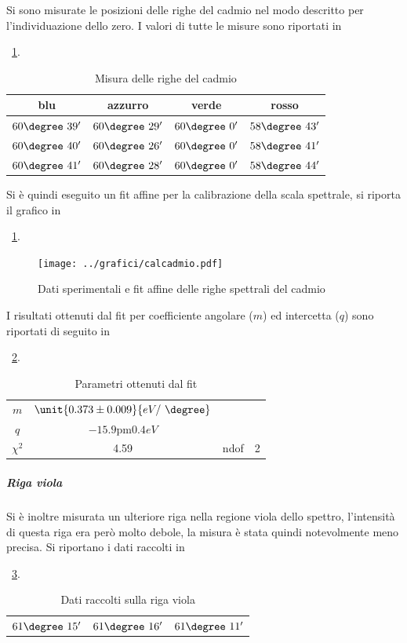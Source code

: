 \documentclass[a4paper,10pt]{article}
\begin{document}
Si sono misurate le posizioni delle righe del cadmio nel modo descritto per l'individuazione dello zero. I valori di tutte le misure sono riportati in \tablename{~\ref{tab:cadmio}.

\begin{table}[H]
	\centering
	\begin{tabular}{c|c|c|c}
	blu & azzurro & verde & rosso \\
	\hline
	$60\degree~39'$ & $60\degree~29'$ & $60\degree~0'$ & $58\degree~43'$\\
	$60\degree~40'$ & $60\degree~26'$ & $60\degree~0'$ & $58\degree~41'$\\
	$60\degree~41'$ & $60\degree~28'$ & $60\degree~0'$ & $58\degree~44'$\\
	\end{tabular}
	\caption{Misura delle righe del cadmio}
	\label{tab:cadmio}
\end{table}

Si è quindi eseguito un fit affine per la calibrazione della scala spettrale, si riporta il grafico in \figurename{~\ref{fig:cadmio}.

\begin{figure}[H]
	\centering
	\texttt{[image: ../grafici/calcadmio.pdf]}
	\caption{Dati sperimentali e fit affine delle righe spettrali del cadmio}
	\label{fig:cadmio}
\end{figure}

I risultati ottenuti dal fit per coefficiente angolare ($m$) ed intercetta ($q$) sono riportati di seguito in \tablename{~\ref{tab:calcadmio}.
	

\begin{table}[H]
	\centering
	\begin{tabular}{|c|c|c|c|}
		\cline{0-1}		
		$m$ & $\unit{0.373 \pm 0.009}{eV/~\degree}$ \\
		\cline{0-1}
		$q$ & $\unit{-15.9 \pm 0.4}{eV}$ \\
		\hline
		$\chi^2$ & 4.59& ndof & 2\\
		\hline
	\end{tabular}
	\caption{Parametri ottenuti dal fit}
	\label{tab:calcadmio}
\end{table}

\subparagraph{Riga viola} Si è inoltre misurata un ulteriore riga nella regione viola dello spettro, l'intensità di questa riga era però molto debole, la misura è stata quindi notevolmente meno precisa.
Si riportano i dati raccolti in \tablename{~\ref{tab:viola}.
	
\begin{table}[H]
	\centering
	\begin{tabular}{c|c|c}
		$61\degree~15'$  & $61\degree~16'$ & $61\degree~11'$\\
	\end{tabular}
	\caption{Dati raccolti sulla riga viola}
	\label{tab:viola}
\end{table}
	
}}}}
\end{document}
